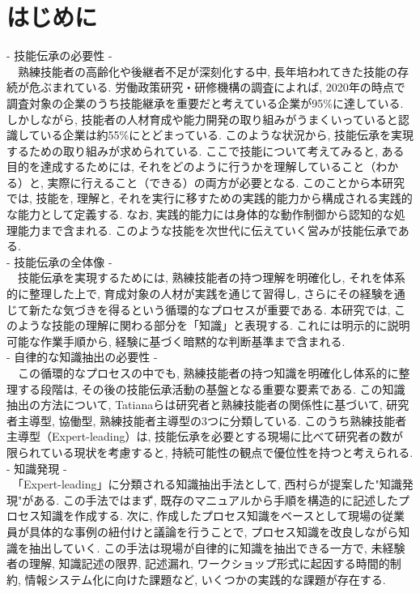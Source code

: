 \chapter{はじめに}
- 技能伝承の必要性 -\\
　熟練技能者の高齢化や後継者不足が深刻化する中, 長年培われてきた技能の存続が危ぶまれている. 労働政策研究・研修機構の調査によれば, 2020年の時点で調査対象の企業のうち技能継承を重要だと考えている企業が95\%に達している. しかしながら, 技能者の人材育成や能力開発の取り組みがうまくいっていると認識している企業は約55\%にとどまっている\cite{JILPT2020}. このような状況から, 技能伝承を実現するための取り組みが求められている. ここで技能について考えてみると, ある目的を達成するためには, それをどのように行うかを理解していること（わかる）と, 実際に行えること（できる）の両方が必要となる. このことから本研究では, 技能を, 理解と, それを実行に移すための実践的能力から構成される実践的な能力として定義する. なお, 実践的能力には身体的な動作制御から認知的な処理能力まで含まれる. このような技能を次世代に伝えていく営みが技能伝承である.\\

- 技能伝承の全体像 -\\
　技能伝承を実現するためには, 熟練技能者の持つ理解を明確化し, それを体系的に整理した上で, 育成対象の人材が実践を通じて習得し, さらにその経験を通じて新たな気づきを得るという循環的なプロセスが重要である. 本研究では, このような技能の理解に関わる部分を「知識」と表現する. これには明示的に説明可能な作業手順から, 経験に基づく暗黙的な判断基準まで含まれる.\\

- 自律的な知識抽出の必要性 -\\
　この循環的なプロセスの中でも, 熟練技能者の持つ知識を明確化し体系的に整理する段階は, その後の技能伝承活動の基盤となる重要な要素である. この知識抽出の方法について, Tatianaらは研究者と熟練技能者の関係性に基づいて, 研究者主導型, 協働型, 熟練技能者主導型の3つに分類している\cite{Tatiana2012}. このうち熟練技能者主導型（Expert-leading）は, 技能伝承を必要とする現場に比べて研究者の数が限られている現状を考慮すると, 持続可能性の観点で優位性を持つと考えられる.\\

- 知識発現 -\\
　「Expert-leading」に分類される知識抽出手法として, 西村らが提案した"知識発現"\cite{Nishimura2017}がある. この手法ではまず, 既存のマニュアルから手順を構造的に記述したプロセス知識を作成する. 次に, 作成したプロセス知識をベースとして現場の従業員が具体的な事例の紐付けと議論を行うことで, プロセス知識を改良しながら知識を抽出していく. この手法は現場が自律的に知識を抽出できる一方で, 未経験者の理解, 知識記述の限界, 記述漏れ, ワークショップ形式に起因する時間的制約, 情報システム化に向けた課題など, いくつかの実践的な課題が存在する.\\

